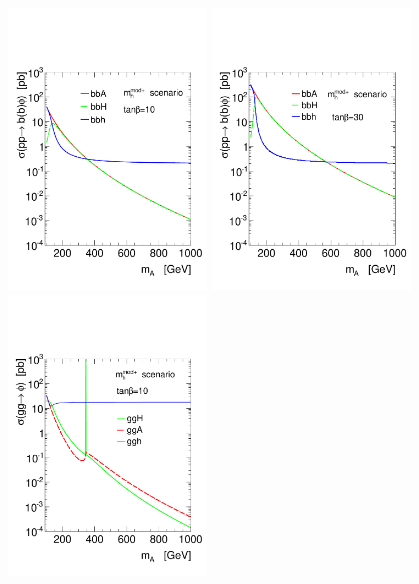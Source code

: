 \begin{figure}[tp]
     \begin{center}
            \includegraphics[width=0.47\textwidth]{figure/bbA10.pdf}
            \includegraphics[width=0.47\textwidth]{figure/bbA30.pdf}
            \includegraphics[width=0.47\textwidth]{figure/ggA10.pdf}

\end{center}
\end{figure}

